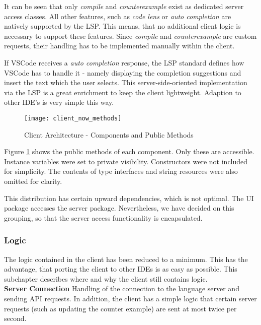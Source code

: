 It can be seen that only \textit{compile} and \textit{counterexample} exist as dedicated server access classes.
All other features, such as \textit{code lens} or \textit{auto completion} are natively supported by the LSP.
This means, that no additional client logic is necessary to support these features.
Since \textit{compile} and \textit{counterexample} are custom requests, their handling has to be implemented manually within the client.

If VSCode receives a \textit{auto completion} response, the LSP standard defines how VSCode has to handle it - 
namely displaying the completion suggestions and insert the text which the user selects.
This server-side-oriented implementation via the LSP is a great enrichment to keep the client lightweight.
Adaption to other IDE's is very simple this way.

\begin{figure}[H]
    \centering
    \texttt{[image: client\_now\_methods]}
    \caption{Client Architecture - Components and Public Methods}
    \label{fig:client_now_methods}
\end{figure}

Figure \ref{fig:client_now_methods} shows the public methods of each component.
Only these are accessible.
Instance variables were set to private visibility.
Constructors were not included for simplicity.
The contents of type interfaces and string resources were also omitted for clarity.

This distribution has certain upward dependencies, which is not optimal.
The UI package accesses the server package.
Nevertheless, we have decided on this grouping,
so that the server access functionality is encapsulated.

\subsubsection{Logic}
The logic contained in the client has been reduced to a minimum.
This has the advantage, that porting the client to other IDEs is as easy as possible.
This subchapter describes where and why the client still contains logic.\\

{\bf Server Connection} \textendash{} 
Handling of the connection to the language server and sending API requests.
In addition, the client has a simple logic that certain server requests (such as updating the counter example) are sent at most twice per second. \\

